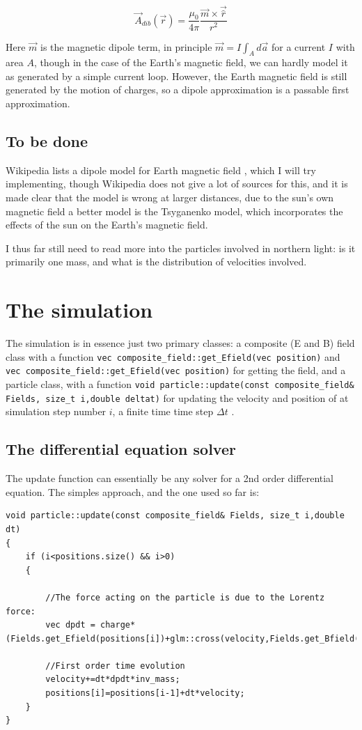 \documentclass[a4paper,12pt,article]{memoir}
\begin{document}
\begin{equation}
\vec{A}_{dib}(\vec{r})= \frac{\mu_0}{4\pi} \frac{\vec{m}\times \vec{\hat{r}}}{r^2}
\end{equation}

Here $\vec{m}$ is the magnetic dipole term, in principle $\vec{m}=I\int_A d\vec{a}$ for a current $I$ with area $A$, though in the case of the Earth's magnetic field, we can hardly model it as generated by a simple current loop. However, the Earth magnetic field is still generated by the motion of charges, so a dipole approximation is a passable first approximation.

\section{To be done}
Wikipedia lists a dipole model for Earth magnetic field \cite{wikidipole}, which I will try implementing, though Wikipedia does not give a lot of sources for this, and it is made clear that the model is wrong at larger distances, due to the sun's own magnetic field a better model is the  Tsyganenko model, which incorporates the effects of the sun on the Earth's magnetic field.

I thus far still need to read more into the particles involved in northern light: is it primarily one mass, and what is the distribution of velocities involved.

\chapter{The simulation}
The simulation is in essence just two primary classes: a composite (E and B) field class with a function \lstinline{vec composite_field::get_Efield(vec position)} and \lstinline{vec composite_field::get_Efield(vec position)} for getting the field, and a particle class, with a function \lstinline{void particle::update(const composite_field& Fields, size_t i,double deltat)} for updating the velocity and position of at simulation step number $i$, a finite time time step $\Delta t$ .


\section{The differential equation solver}

The update function can essentially be any solver for a 2nd order differential equation. The simples approach, and the one used so far is:

\begin{lstlisting}
void particle::update(const composite_field& Fields, size_t i,double dt)
{
    if (i<positions.size() && i>0)
    {

        //The force acting on the particle is due to the Lorentz force:
        vec dpdt = charge*(Fields.get_Efield(positions[i])+glm::cross(velocity,Fields.get_Bfield(positions[i])));

        //First order time evolution
        velocity+=dt*dpdt*inv_mass;
        positions[i]=positions[i-1]+dt*velocity;
    }
}
\end{lstlisting}
\end{document}

